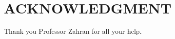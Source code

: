 \documentclass[letterpaper, 10 pt, conference]{ieeeconf}  %
\begin{document}








\section*{ACKNOWLEDGMENT}

Thank you Professor Zahran for all your help.
\end{document}
